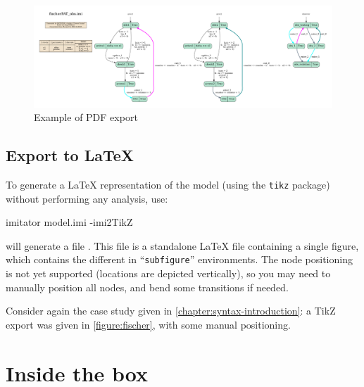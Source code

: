 \begin{figure}
	\includegraphics[width=\textwidth]{include/fischerPAT_obs-pta.pdf}

	\caption{Example of PDF export}
	\label{figure:PDF-export}
\end{figure}




\section{Export to \LaTeX{}}

To generate a \LaTeX{} representation of the \NIPTA{} model (using the \texttt{tikz} package) without performing any analysis, use:

\begin{terminal}
imitator model.imi -imi2TikZ
\end{terminal}

\imitator{} will generate a file .
This file is a standalone \LaTeX{} file containing a single figure, which contains the different \IPTA{} in ``\texttt{subfigure}'' environments.
The node positioning is not yet supported (locations are depicted vertically), so you may need to manually position all nodes, and bend some transitions if needed.


\begin{example}
	Consider again the case study given in \cref{chapter:syntax-introduction}: a TikZ export was given in \cref{figure:fischer}, with some manual positioning.
\end{example}






\chapter{Inside the box}



